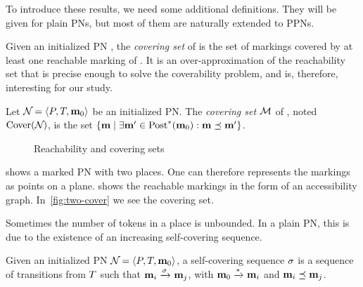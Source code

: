 To introduce these results, we need some additional definitions.
They will be given for plain \acp{PN}, but most of them are naturally extended to \acp{PPN}.

Given an initialized \ac{PN} \namePN, the \emph{covering set} of \namePN is the set of markings covered by at least one reachable marking of \namePN.
It is an over-approximation of the reachability set that is precise enough to solve the coverability problem, and is, therefore, interesting for our study.

\begin{defi}
  Let $\defPN$ be an initialized \ac{PN}.
  The \emph{covering set} $\mathcal{M}$ of \namePN, noted $\operatorname{Cover}(\mathcal{N}_{})$, is the set $\left\{\mathbf{m} \mid \exists \mathbf{m}' \in \operatorname{Post}^*_{{}}(\mathbf{m}_0) : \mathbf{m} \preceq \mathbf{m}' \right\}$.
\end{defi}

\begin{figure}[htbp]
  \label{fig:reach-and-cover-example}
  \centering
  \subfloat[A \ac{PN} ($\card{\places} = 2$)]{
    \label{fig:two-net}
    

  }

  \qquad
  \caption{Reachability and covering sets}
\end{figure}

 shows a marked \ac{PN} with two places.
One can therefore represents the markings as points on a plane.
 shows the reachable markings in the form of an accessibility graph.
In~\ref{fig:two-cover} we see the covering set.

Sometimes the number of tokens in a place is unbounded. %
In a plain \ac{PN}, this is due to the existence of an increasing self-covering sequence.
\begin{defi}
  Given an initialized \ac{PN} $\defPN$,
  a self-covering sequence $\seqt$ is a sequence of transitions from $T$ such that
  \(
    \mar_i \fire{\seqt} \mar_j
  \),
  with $\mathbf{m}_0 \xrightarrow{*}_{} \mathbf{m}_i$ %
  and $\mathbf{m}_i \preceq \mathbf{m}_j$.
\end{defi}

